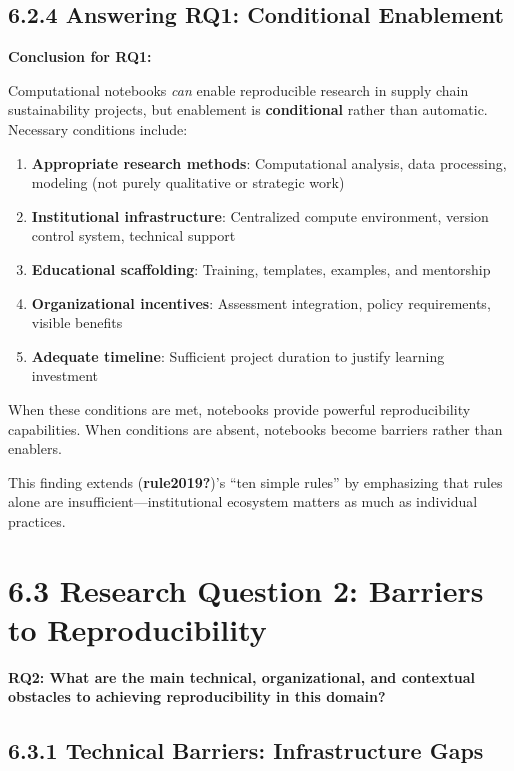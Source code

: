 \documentclass[
  oneside,
  open=any]{scrbook}
\providecommand{\tightlist}{%
  \setlength{\itemsep}{0pt}\setlength{\parskip}{0pt}}\usepackage{longtable,booktabs,array}
\begin{document}
\subsection{6.2.4 Answering RQ1: Conditional
Enablement}\label{answering-rq1-conditional-enablement}

\textbf{Conclusion for RQ1:}

Computational notebooks \emph{can} enable reproducible research in
supply chain sustainability projects, but enablement is
\textbf{conditional} rather than automatic. Necessary conditions
include:

\begin{enumerate}
\def\labelenumi{\arabic{enumi}.}
\tightlist
\item
  \textbf{Appropriate research methods}: Computational analysis, data
  processing, modeling (not purely qualitative or strategic work)
\item
  \textbf{Institutional infrastructure}: Centralized compute
  environment, version control system, technical support
\item
  \textbf{Educational scaffolding}: Training, templates, examples, and
  mentorship
\item
  \textbf{Organizational incentives}: Assessment integration, policy
  requirements, visible benefits
\item
  \textbf{Adequate timeline}: Sufficient project duration to justify
  learning investment
\end{enumerate}

When these conditions are met, notebooks provide powerful
reproducibility capabilities. When conditions are absent, notebooks
become barriers rather than enablers.

This finding extends (\textbf{rule2019?})'s ``ten simple rules'' by
emphasizing that rules alone are insufficient---institutional ecosystem
matters as much as individual practices.

\section{6.3 Research Question 2: Barriers to
Reproducibility}\label{research-question-2-barriers-to-reproducibility}

\textbf{RQ2: What are the main technical, organizational, and contextual
obstacles to achieving reproducibility in this domain?}

\subsection{6.3.1 Technical Barriers: Infrastructure
Gaps}\label{technical-barriers-infrastructure-gaps}
\end{document}
